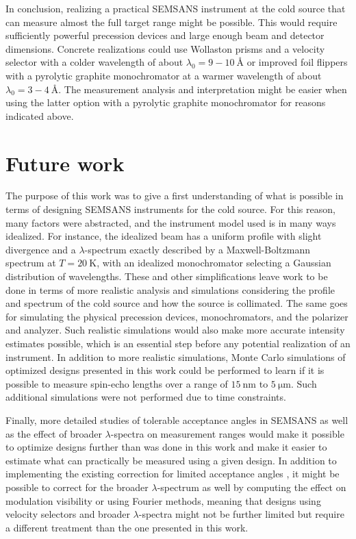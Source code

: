 In conclusion, realizing a practical SEMSANS instrument at the cold source that can measure almost the full target range might be possible. This would require sufficiently powerful precession devices and large enough beam and detector dimensions. Concrete realizations could use Wollaston prisms and a velocity selector with a colder wavelength of about $\lambda_0 = 9 - 10~\unit{\angstrom}$ or improved foil flippers with a pyrolytic graphite monochromator at a warmer wavelength of about $\lambda_0 = 3 - 4~\unit{\angstrom}$. The measurement analysis and interpretation might be easier when using the latter option with a pyrolytic graphite monochromator for reasons indicated above.

\section{Future work}
The purpose of this work was to give a first understanding of what is possible in terms of designing SEMSANS instruments for the cold source. For this reason, many factors were abstracted, and the instrument model used is in many ways idealized. For instance, the idealized beam has a uniform profile with slight divergence and a $\lambda$-spectrum exactly described by a Maxwell-Boltzmann spectrum at $T= \SI{20}{\kelvin}$, with an idealized monochromator selecting a Gaussian distribution of wavelengths. These and other simplifications leave work to be done in terms of more realistic analysis and simulations considering the profile and spectrum of the cold source and how the source is collimated. The same goes for simulating the physical precession devices, monochromators, and the polarizer and analyzer. Such realistic simulations would also make more accurate intensity estimates possible, which is an essential step before any potential realization of an instrument. In addition to more realistic simulations, Monte Carlo simulations of optimized designs presented in this work could be performed to learn if it is possible to measure spin-echo lengths over a range of $\SI{15}{\nano\meter}$ to $\SI{5}{\micro\meter}$. Such additional simulations were not performed due to time constraints.

Finally, more detailed studies of tolerable acceptance angles in SEMSANS as well as the effect of broader $\lambda$-spectra on measurement ranges would make it possible to optimize designs further than was done in this work and make it easier to estimate what can practically be measured using a given design. In addition to implementing the existing correction for limited acceptance angles \cite{kusmin2017}, it might be possible to correct for the broader $\lambda$-spectrum as well by computing the effect on modulation visibility or using Fourier methods, meaning that designs using velocity selectors and broader $\lambda$-spectra might not be further limited but require a different treatment than the one presented in this work.

